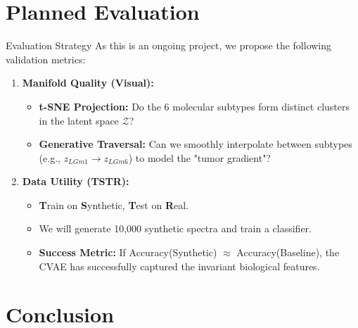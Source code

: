 \documentclass[aspectratio=169, 10pt]{beamer}
\begin{document}
\section{Planned Evaluation}

\begin{frame}{Evaluation Strategy}
    As this is an ongoing project, we propose the following validation metrics:
    
    \vspace{1em}
    \begin{enumerate}
        \item \textbf{Manifold Quality (Visual):}
        \begin{itemize}
            \item \textbf{t-SNE Projection:} Do the 6 molecular subtypes form distinct clusters in the latent space $\mathcal{Z}$?
            \item \textbf{Generative Traversal:} Can we smoothly interpolate between subtypes (e.g., $z_{LGm1} \to z_{LGm6}$) to model the "tumor gradient"?
        \end{itemize}
        
        \vspace{1em}
        \item \textbf{Data Utility (TSTR):}
        \begin{itemize}
            \item \textbf{T}rain on \textbf{S}ynthetic, \textbf{T}est on \textbf{R}eal.
            \item We will generate 10,000 synthetic spectra and train a classifier.
            \item \textbf{Success Metric:} If Accuracy(Synthetic) $\approx$ Accuracy(Baseline), the CVAE has successfully captured the invariant biological features.
        \end{itemize}
    \end{enumerate}
\end{frame}

\section{Conclusion}
\end{document}
